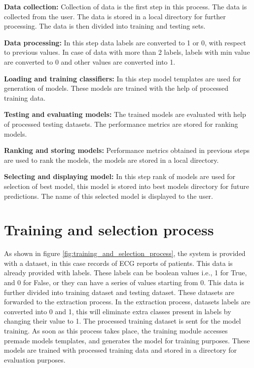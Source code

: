 \textbf{Data collection:} Collection of data is the first step in this process. The data is collected from the user. The data is stored in a local directory for further processing. The data is then divided into training and testing sets.

\vspace{-0.5em}
\textbf{Data processing:} In this step data labels are converted to 1 or 0, with respect to previous values. In case of data with more than 2 labels, labels with min value are converted to 0 and other values are converted into 1.

\vspace{-0.5em}
\textbf{Loading and training classifiers:} In this step model templates are used for generation of models. These models are trained with the help of processed training data.

\vspace{-0.5em}
\textbf{Testing and evaluating models:} The trained models are evaluated with help of processed testing datasets. The performance metrics are stored for ranking models.

\vspace{-0.5em}
\textbf{Ranking and storing models:} Performance metrics obtained in previous steps are used to rank the models, the models are stored in a local directory.

\vspace{-0.5em}
\textbf{Selecting and displaying model:} In this step rank of models are used for selection of best model, this model is stored into best models directory for future predictions. The name of this selected model is displayed to the user.

\section{Training and selection process} \label{sec:data_flow}

As shown in figure \ref{fig:training_and_selection_process}, the system is provided with a dataset, in this case records of ECG reports of patients. This data is already provided with labels. These labels can be boolean values i.e., 1 for True, and 0 for False, or they can have a series of values starting from 0. This data is further divided into training dataset and testing dataset. These datasets are forwarded to the extraction process. In the extraction process, datasets labels are converted into 0 and 1, this will eliminate extra classes present in labels by changing their value to 1. The processed training dataset is sent for the model training. As soon as this process takes place, the training module accesses premade models templates, and generates the model for training purposes. These models are trained with processed training data and stored in a directory for evaluation purposes.

